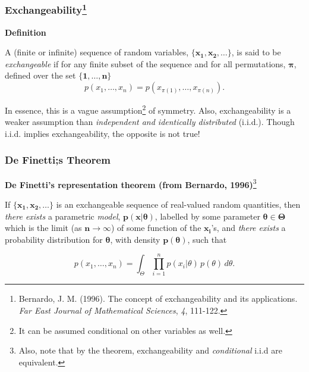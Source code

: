 \documentclass{beamer}
\begin{document}

\begin{frame}
    \frametitle{Exchangeability\footnote{
        Bernardo, J. M. (1996).
        The concept of exchangeability and its applications.
        \emph{Far East Journal of Mathematical Sciences}, \emph{4}, 111-122.
    }}
    \textbf{Definition}

    \vfill

    A (finite or infinite) sequence of random variables, $\boldsymbol{\{x_1, x_2, \ldots\}}$,
    is said to be \emph{exchangeable} if for any finite subset of the sequence
    and for all permutations, $\boldsymbol{\pi}$, defined over the set $\boldsymbol{\{1, \ldots, n\}}$
    \[p(x_1, \ldots, x_n) = p(x_{\pi(1)}, \ldots, x_{\pi(n)}).\]

    \vfill

    In essence, this is a vague assumption\footnote{
    It can be assumed conditional on other variables as well.} of symmetry.
    Also, exchangeability is a weaker assumption than \emph{independent and identically distributed} (i.i.d.).
    Though i.i.d. implies exchangeability, the opposite is not true!
\end{frame}

\begin{frame}
    \frametitle{De Finetti;s Theorem}

    \vfill
    
    \textbf{De Finetti's representation theorem (from Bernardo, 1996)}\footnote{
    Also, note that by the theorem, exchangeability and \emph{conditional} i.i.d are equivalent.}

    \vfill

    If $\boldsymbol{\{x_1, x_2, \ldots\}}$ is an exchangeable sequence of real-valued random quantities,
    then \emph{there exists} a parametric \emph{model}, $\boldsymbol{p(x | \theta)}$, labelled by some
    parameter $\boldsymbol{\theta \in \Theta}$ which is the limit (as $\boldsymbol{n \to \infty}$)
    of some function of the $\boldsymbol{x_i}$'s, and \emph{there exists} a probability distribution
    for $\boldsymbol{\theta}$, with density $\boldsymbol{p(\theta)}$, such that

    \[p(x_1, \ldots, x_n) = \int_{\Theta} \prod_{i = 1}^{n} p(x_i | \theta) \, p(\theta) \, d\theta.\]
\end{frame}
\end{document}
